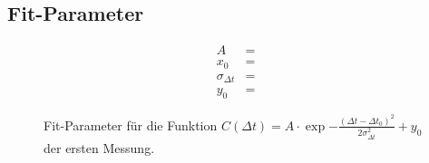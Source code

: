 \subsection{Fit-Parameter}
\label{sec:fitval}

\begin{figure}[H]
	\begin{align*}
		A &=  \\
		x_0 &=  \\
		\sigma_{\Delta t} &=  \\
		y_0 &= 
	\end{align*}
	\caption{Fit-Parameter für die Funktion $C(\Delta t) = A \cdot \exp{-\frac{(\Delta t - \Delta t_0)^2}{2 \sigma_{\Delta t}^2}} + y_0$ der ersten Messung.}
	\label{fig:fitval1}
\end{figure}
